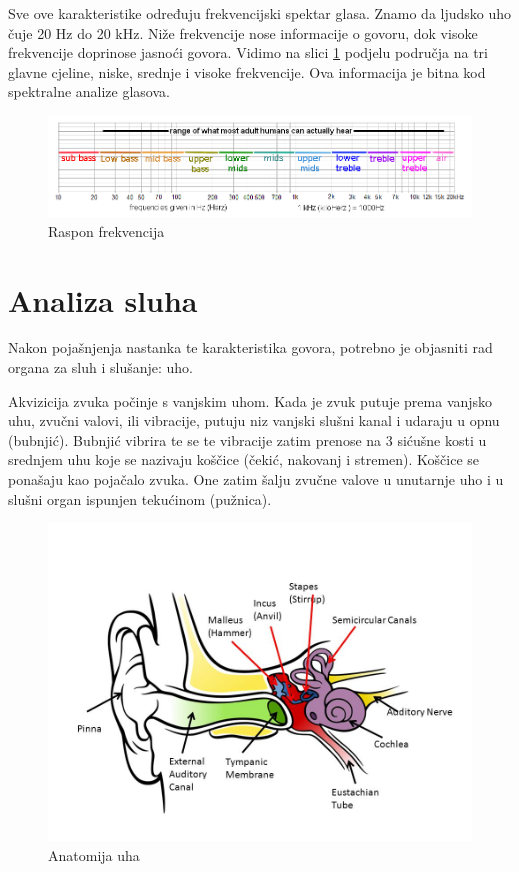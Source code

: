 \documentclass[times, utf8, diplomski]{fer}
\begin{document}
Sve ove karakteristike određuju frekvencijski spektar glasa. Znamo da ljudsko uho čuje 20 Hz do 20 kHz. Niže frekvencije nose informacije o govoru, dok visoke frekvencije doprinose jasnoći govora. Vidimo na slici \ref{raspon} podjelu područja na tri glavne cjeline, niske, srednje i visoke frekvencije. Ova informacija je bitna kod spektralne analize glasova.

\begin{figure}[hbt!]
 \centering
 \includegraphics[scale=0.5]{photos/raspon.png}
 \caption{Raspon frekvencija}
 \label{raspon}
\end{figure}


\chapter{Analiza sluha}
\label{chap:sluh}
Nakon pojašnjenja nastanka te karakteristika govora, potrebno je objasniti rad organa za sluh i slušanje: uho.

Akvizicija zvuka počinje s vanjskim uhom. Kada je zvuk putuje prema vanjsko uhu, zvučni valovi, ili vibracije, putuju niz vanjski slušni kanal i udaraju u opnu (bubnjić). Bubnjić vibrira te se te vibracije zatim prenose na 3 sićušne kosti u srednjem uhu koje se nazivaju koščice (čekić, nakovanj i stremen). Koščice se ponašaju kao pojačalo zvuka. One zatim šalju zvučne valove u unutarnje uho i u slušni organ ispunjen tekućinom (pužnica).

\begin{figure}[hbt!]
 \centering
 \includegraphics[scale=0.5]{photos/earanatomy.png}
 \caption{Anatomija uha }
\end{figure}
\end{document}
